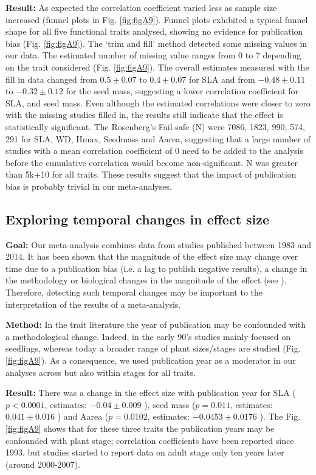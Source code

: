 \documentclass[a4paper,11pt]{article}
\begin{document}
\begin{appendices}
\textbf{Result:} As expected the correlation coefficient varied less as sample size increased (funnel plots in Fig. \ref{fig:figA9}). Funnel plots exhibited a typical funnel shape for all five functional traits analysed, showing no evidence for publication bias (Fig. \ref{fig:figA9}).
The ‘trim and fill’ method detected some missing values in our data. The estimated number of missing value ranges from 0 to 7 depending on the trait considered (Fig. \ref{fig:figA9}). The overall estimates measured with the fill in data changed from $0.5 \pm 0.07$  to $0.4 \pm 0.07$ for SLA and from $-0.48 \pm 0.11$ to $-0.32 \pm 0.12$ for the seed mass, suggesting a lower correlation coefficient for SLA, and seed mass. Even although the estimated correlations were closer to zero with the missing studies filled in, the results still indicate that the effect is statistically significant.
The Rosenberg’s Fail-safe (N) were 7086, 1823, 990, 574, 291 for SLA, WD, Hmax, Seedmass and Aarea, suggesting that a large number of studies with a mean correlation coefficient of 0 need to be added to the analysis before the cumulative correlation would become non-significant. N was greater than 5k+10 for all traits.
These results suggest that the impact of publication bias is probably trivial in our meta-analyses.

\subsection{Exploring temporal changes in effect size}
\textbf{Goal:} Our meta-analysis combines data from studies published between 1983 and 2014. It has been shown that the magnitude of the effect size may change over time due to a publication bias (i.e. a lag to publish negative results), a change in the methodology or biological changes in the magnitude of the effect (see \citealt{Koricheva:2013hy}). Therefore, detecting such temporal changes may be important to the interpretation of the results of a meta-analysis.

\textbf{Method:} In the trait literature the year of publication may be confounded with a methodological change. Indeed, in the early 90’s studies mainly focused on seedlings, whereas today a broader range of plant sizes/stages are studied (Fig. \ref{fig:figA9}). As a consequence, we used publication year as a moderator in our analyses \citep{Zvereva:2008jm} across but also within stages for all traits.  

\textbf{Result:} There was a change in the effect size with publication year for SLA ($p<0.0001$, estimates: $-0.04 \pm 0.009$ ), seed mass ($p = 0.011$, estimates: $0.041 \pm 0.016$ ) and Aarea ($p = 0.0102$, estimates: $-0.0453 \pm 0.0176$ ). The Fig. \ref{fig:figA9} shows that for these three traits the publication years may be confounded with plant stage; correlation coefficients have been reported since 1993, but studies started to report data on adult stage only ten years later (around 2000-2007).


\end{appendices}
\end{document}
